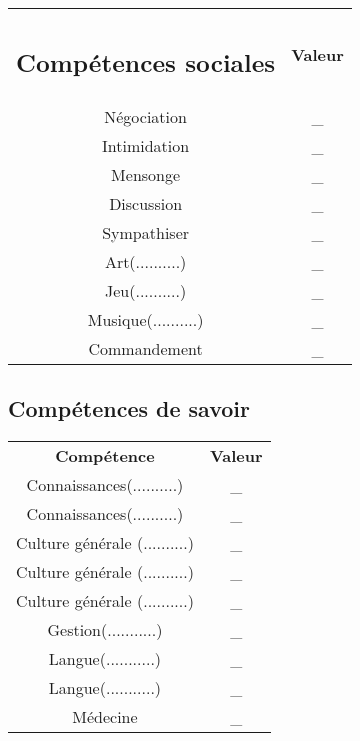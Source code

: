 \documentclass[10pt,a4paper]{article}
\begin{document}
\begin{multicols}{3}
\begin{tabular}{cc}
  \subsection*{Compétences sociales}
  \begin{tabular}{cc}
  \textbf{Compétence}& \textbf{Valeur}\\
  Négociation& \_\\
  Intimidation& \_\\
  Mensonge& \_\\
  Discussion& \_\\
  Sympathiser& \_\\
  Art(..........)& \_\\
  Jeu(..........)& \_\\
  Musique(..........)& \_\\
  Commandement& \_\\
  \end{tabular}
  \subsection*{Compétences de savoir}
  \begin{tabular}{cc}
  \textbf{Compétence}& \textbf{Valeur}\\
  Connaissances(..........)& \_\\
  Connaissances(..........)& \_\\
  Culture générale (..........)& \_\\
  Culture générale (..........)& \_\\
  Culture générale (..........)& \_\\
  Gestion(...........)& \_\\
  Langue(...........)& \_\\
  Langue(...........)& \_\\
  Médecine& \_\\
  \end{tabular}
\end{multicols}
\newpage
\end{document}
